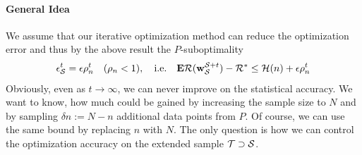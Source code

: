 \documentclass{article}
\renewcommand{\S}{{\cal S}}
\newcommand{\T}{{\cal T}}
\newcommand{\w}{{\bf w}}
\newcommand{\risk}{{\cal R}}
\newcommand{\bound}{{\cal H}}
\newcommand{\E}{{\bf E}}
\begin{document}
\paragraph{General Idea}

We assume that our iterative optimization method can reduce the optimization error and thus by the above result the $P$-suboptimality  
\begin{align}
\epsilon_\S^t =   \epsilon \rho_n^t  \quad (\rho_n <1), \quad  
\text{i.e.} \quad 
\E \risk(\w^{\S+t}_\S) - \risk^*  \le \bound(n) + \epsilon\rho_n^t 
\end{align}
Obviously, even as $t \to \infty$, we can never improve on the statistical accuracy. We want to know, how much could be gained by increasing the sample size to $N$ and by sampling $\delta n := N - n$ additional data points from $P$. Of course, we can use the same bound by replacing $n$ with $N$. The only question is how we can control the optimization accuracy on the extended sample $\T \supset \S$. 
\end{document}
